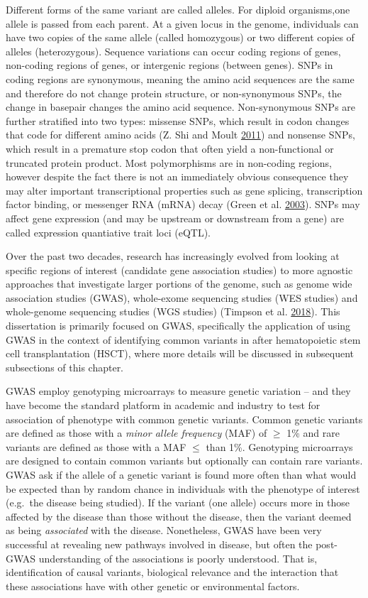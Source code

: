 \documentclass[]{DissertateOSU}
\begin{document}
Different forms of the same variant are called alleles. For diploid
organisms,one allele is passed from each parent. At a given locus in the
genome, individuals can have two copies of the same allele (called
homozygous) or two different copies of alleles (heterozygous). Sequence
variations can occur coding regions of genes, non-coding regions of
genes, or intergenic regions (between genes). SNPs in coding regions are
synonymous, meaning the amino acid sequences are the same and therefore
do not change protein structure, or non-synonymous SNPs, the change in
basepair changes the amino acid sequence. Non-synonymous SNPs are
further stratified into two types: missense SNPs, which result in codon
changes that code for different amino acids (Z. Shi and Moult
\protect\hyperlink{ref-shi_2011}{2011}) and nonsense SNPs, which result
in a premature stop codon that often yield a non-functional or truncated
protein product. Most polymorphisms are in non-coding regions, however
despite the fact there is not an immediately obvious consequence they
may alter important transcriptional properties such as gene splicing,
transcription factor binding, or messenger RNA (mRNA) decay (Green et
al. \protect\hyperlink{ref-green_2003}{2003}). SNPs may affect gene
expression (and may be upstream or downstream from a gene) are called
expression quantiative trait loci (eQTL).

Over the past two decades, research has increasingly evolved from
looking at specific regions of interest (candidate gene association
studies) to more agnostic approaches that investigate larger portions of
the genome, such as genome wide association studies (GWAS), whole-exome
sequencing studies (WES studies) and whole-genome sequencing studies
(WGS studies) (Timpson et al.
\protect\hyperlink{ref-Timpson_2018}{2018}). This dissertation is
primarily focused on GWAS, specifically the application of using GWAS in
the context of identifying common variants in after hematopoietic stem
cell transplantation (HSCT), where more details will be discussed in
subsequent subsections of this chapter.

GWAS employ genotyping microarrays to measure genetic variation -- and
they have become the standard platform in academic and industry to test
for association of phenotype with common genetic variants. Common
genetic variants are defined as those with a \emph{minor allele
frequency} (MAF) of \(\geq\) 1\% and rare variants are defined as those
with a MAF \(\leq\) than 1\%. Genotyping microarrays are designed to
contain common variants but optionally can contain rare variants. GWAS
ask if the allele of a genetic variant is found more often than what
would be expected than by random chance in individuals with the
phenotype of interest (e.g.~the disease being studied). If the variant
(one allele) occurs more in those affected by the disease than those
without the disease, then the variant deemed as being \emph{associated}
with the disease. Nonetheless, GWAS have been very successful at
revealing new pathways involved in disease, but often the post-GWAS
understanding of the associations is poorly understood. That is,
identification of causal variants, biological relevance and the
interaction that these associations have with other genetic or
environmental factors.
\end{document}
